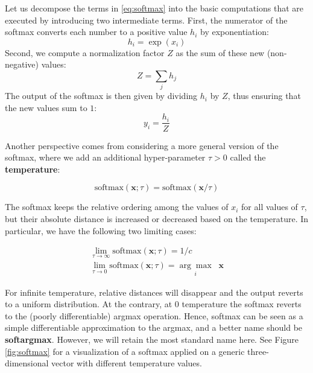 Let us decompose the terms in \eqref{eq:softmax} into the basic computations that are executed by introducing two intermediate terms. First, the numerator of the softmax converts each number to a positive value $h_i$ by exponentiation:
%
\begin{equation}
h_i =\exp(x_i)
\end{equation}
%
Second, we compute a normalization factor $Z$ as the sum of these new (non-negative) values:
%
\begin{equation}
 Z = \sum_jh_j 
 \end{equation}
%
The output of the softmax is then given by dividing $h_i$ by $Z$, thus ensuring that the new values sum to $1$:
%
\begin{equation}
y_i = \frac{h_i}{Z}
\end{equation}

Another perspective comes from considering a more general version of the softmax, where we add an additional hyper-parameter $\tau > 0$ called the \textbf{temperature}:

$$
\text{softmax}(\mathbf{x};\tau)=\text{softmax}(\mathbf{x}/\tau)
$$

The softmax keeps the relative ordering among the values of $x_i$ for all values of $\tau$, but their absolute distance is increased or decreased based on the temperature. In particular, we have the following two limiting cases:

\begin{gather}
\lim_{\tau \rightarrow \infty} \text{softmax}(\mathbf{x};\tau)=1/c \\ 
\lim_{\tau \rightarrow 0} \text{softmax}(\mathbf{x};\tau)=\underset{i}{\arg\max} \;\; \mathbf{x}
\end{gather}

For infinite temperature, relative distances will disappear and the output reverts to a uniform distribution. At the contrary, at $0$ temperature the softmax reverts to the (poorly differentiable) argmax operation. Hence, softmax can be seen as a simple differentiable approximation to the argmax, and a better name should be \textbf{softargmax}. However, we will retain the most standard name here. See Figure \ref{fig:softmax} for a visualization of a softmax applied on a generic three-dimensional vector with different temperature values.

